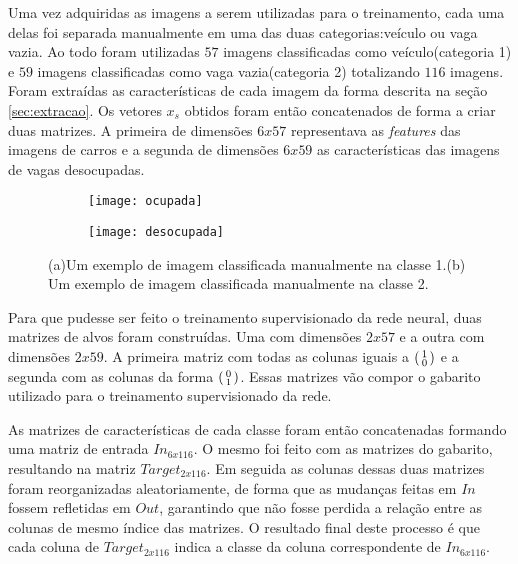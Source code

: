 Uma vez adquiridas as imagens a serem utilizadas para o treinamento, cada uma delas foi separada manualmente em uma das duas categorias:veículo ou vaga vazia. Ao todo foram utilizadas $57$ imagens classificadas como veículo(categoria 1) e $59$ imagens classificadas como vaga vazia(categoria 2) totalizando $116$ imagens. Foram extraídas as características de cada imagem da forma descrita na seção \ref{sec:extracao}. Os vetores $x_s$ obtidos foram então concatenados de forma a criar duas matrizes. A primeira de dimensões $6x57$ representava as \textit{features} das imagens de carros e a segunda de dimensões $6x59$ as características das imagens de vagas desocupadas.

\begin{figure}
\centering
\begin{subfigure}{.1\textwidth}
  \centering
  \texttt{[image: ocupada]}
  \caption{}
  \label{fig:exemploRede:sub:ocupada}
\end{subfigure}%
\begin{subfigure}{.1\textwidth}
  \centering
  \texttt{[image: desocupada]}
  \caption{}
  \label{fig:exemploRede:sub:desocupada}
\end{subfigure}
\centering
\caption{(a)Um exemplo de imagem classificada manualmente na classe 1.(b) Um exemplo de imagem classificada manualmente na classe 2.}
\label{fig:exemploRede}
\end{figure}

Para que pudesse ser feito o treinamento supervisionado da rede neural, duas matrizes de alvos foram construídas. Uma com dimensões $2x57$ e a outra com dimensões $2x59$. A primeira matriz com todas as colunas iguais a $\begin{psmallmatrix}1\\0\end{psmallmatrix}$ e a segunda com as colunas da forma $\begin{psmallmatrix}0\\1\end{psmallmatrix}$. Essas matrizes vão compor o gabarito utilizado para o treinamento supervisionado da rede.

As matrizes  de características de cada classe foram então concatenadas formando uma matriz de entrada $In_{6x116}$. O mesmo foi feito com as matrizes do gabarito, resultando na matriz $Target_{2x116}$. Em seguida as colunas dessas duas matrizes foram reorganizadas aleatoriamente, de forma que as mudanças feitas em $In$ fossem refletidas em $Out$, garantindo que não fosse perdida a relação entre as colunas de mesmo índice das matrizes. O resultado final deste processo é que cada coluna de $Target_{2x116}$ indica a classe da coluna correspondente de $In_{6x116}$.

